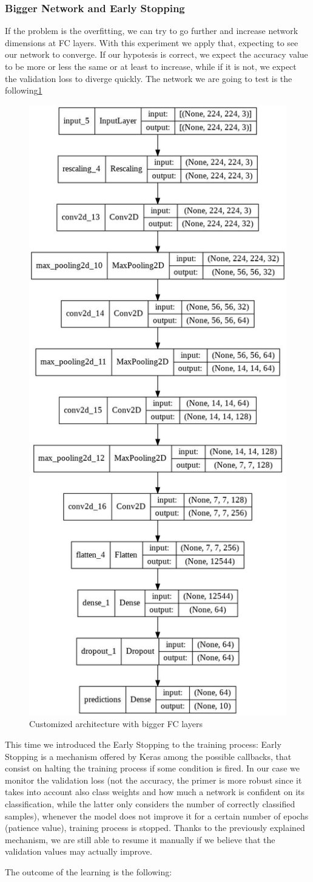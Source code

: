\subsubsection{Bigger Network and Early Stopping}
If the problem is the overfitting, we can try to go further and increase network dimensions at FC layers. With this experiment we apply that, expecting to see our network to converge. If our hypotesis is correct, we expect the accuracy value to be more or less the same or at least to increase, while if it is not, we expect the validation loss to diverge quickly. The network we are going to test is the following\ref{fig: BiggerCNN}

\begin{figure}[H]
	\centering
	\includegraphics[height=0.6\textwidth]{img/scratch/BiggerCNN.jpg}
	\caption{Customized architecture with bigger FC layers}
	\label{fig: BiggerCNN}
\end{figure}

\noindent This time we introduced the Early Stopping to the training process: Early Stopping is a mechanism offered by Keras among the possible callbacks, that consist on halting the training process if some condition is fired. In our case we monitor the validation loss (not the accuracy, the primer is more robust since it takes into account also class weights and how much a network is confident on its classification, while the latter only considers the number of correctly classified samples), whenever the model does not improve it for a certain number of epochs (patience value), training process is stopped. Thanks to the previously explained mechanism, we are still able to resume it manually if we believe that the validation values may actually improve.

\noindent The outcome of the learning is the following:

